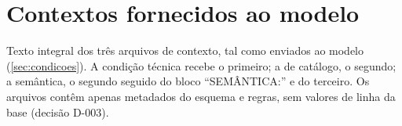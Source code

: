 \chapter{Contextos fornecidos ao modelo}
\label{ap:contextos}

Texto integral dos três arquivos de contexto, tal como enviados ao modelo
(\autoref{sec:condicoes}). A condição técnica recebe o primeiro; a de
catálogo, o segundo; a semântica, o segundo seguido do bloco
``SEMÂNTICA:'' e do terceiro. Os arquivos contêm apenas metadados do
esquema e regras, sem valores de linha da base (decisão D-003).

  {\def\ctxdir{contextos/}}
  {\def\ctxdir{../data/datasets/commercial/}}






